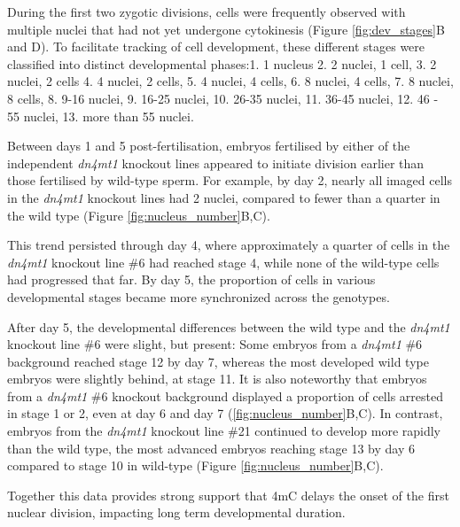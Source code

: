 During the first two zygotic divisions, cells were frequently observed with multiple nuclei that had not yet undergone cytokinesis (Figure \ref{fig:dev_stages}B and D).  To facilitate tracking of cell development, these different stages were classified into distinct developmental phases:1. 1 nucleus 2. 2 nuclei, 1 cell, 3. 2 nuclei, 2 cells 4. 4 nuclei, 2 cells, 5. 4 nuclei, 4 cells, 6. 8 nuclei, 4 cells, 7. 8 nuclei, 8 cells, 8. 9-16 nuclei, 9. 16-25 nuclei, 10. 26-35 nuclei, 11. 36-45 nuclei, 12. 46 - 55 nuclei, 13. more than 55 nuclei.

Between days 1 and 5 post-fertilisation, embryos fertilised by either of the independent \textit{dn4mt1} knockout lines appeared to initiate division earlier than those fertilised by wild-type sperm. For example, by day 2, nearly all imaged cells in the \textit{dn4mt1} knockout lines had 2 nuclei, compared to fewer than a quarter in the wild type (Figure \ref{fig:nucleus_number}B,C).  

This trend persisted through day 4, where approximately a quarter of cells in the \textit{dn4mt1} knockout line \#6 had reached stage 4, while none of the wild-type cells had progressed that far. By day 5, the proportion of cells in various developmental stages became more synchronized across the genotypes. 

After day 5, the developmental differences between the wild type and the \textit{dn4mt1} knockout line \#6 were slight, but present: Some embryos from a \textit{dn4mt1} \#6 background reached stage 12 by day 7, whereas the most developed wild type embryos were slightly behind, at stage 11. It is also noteworthy that embryos from a  \textit{dn4mt1} \#6 knockout background displayed a proportion of cells arrested in stage 1 or 2, even at day 6 and day 7 (\ref{fig:nucleus_number}B,C). In contrast, embryos from the \textit{dn4mt1} knockout line \#21 continued to develop more rapidly than the wild type, the most advanced embryos reaching stage 13 by day 6 compared to stage 10 in wild-type (Figure \ref{fig:nucleus_number}B,C). 

Together this data provides strong support that 4mC delays the onset of the first nuclear division, impacting long term developmental duration.



